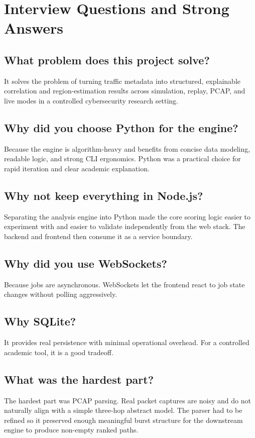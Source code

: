 \documentclass[12pt,a4paper]{report}
\begin{document}
\chapter{Interview Questions and Strong Answers}
\section{What problem does this project solve?}
It solves the problem of turning traffic metadata into structured, explainable correlation and region-estimation results across simulation, replay, PCAP, and live modes in a controlled cybersecurity research setting.

\section{Why did you choose Python for the engine?}
Because the engine is algorithm-heavy and benefits from concise data modeling, readable logic, and strong CLI ergonomics. Python was a practical choice for rapid iteration and clear academic explanation.

\section{Why not keep everything in Node.js?}
Separating the analysis engine into Python made the core scoring logic easier to experiment with and easier to validate independently from the web stack. The backend and frontend then consume it as a service boundary.

\section{Why did you use WebSockets?}
Because jobs are asynchronous. WebSockets let the frontend react to job state changes without polling aggressively.

\section{Why SQLite?}
It provides real persistence with minimal operational overhead. For a controlled academic tool, it is a good tradeoff.

\section{What was the hardest part?}
The hardest part was PCAP parsing. Real packet captures are noisy and do not naturally align with a simple three-hop abstract model. The parser had to be refined so it preserved enough meaningful burst structure for the downstream engine to produce non-empty ranked paths.
\end{document}
